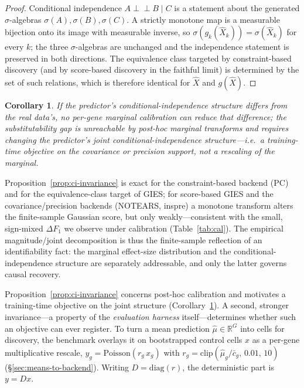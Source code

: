 \documentclass{article}
\theoremstyle{plain}
\newtheorem{corollary}[theorem]{Corollary}
\theoremstyle{definition}
\theoremstyle{remark}
\begin{document}
\begin{proof}
Conditional independence $A\perp\!\!\!\perp B\mid C$ is a statement about the generated $\sigma$-algebras $\sigma(A),\sigma(B),\sigma(C)$. A strictly monotone map is a measurable bijection onto its image with measurable inverse, so $\sigma(g_k(\hat X_k))=\sigma(\hat X_k)$ for every $k$; the three $\sigma$-algebras are unchanged and the independence statement is preserved in both directions. The equivalence class targeted by constraint-based discovery (and by score-based discovery in the faithful limit) is determined by the set of such relations, which is therefore identical for $\hat X$ and $g(\hat X)$.
\end{proof}

\begin{corollary}
\label{cor:calib-kernel}
If the predictor's conditional-independence structure differs from the real data's, no per-gene marginal calibration can reduce that difference; the substitutability gap is unreachable by post-hoc marginal transforms and requires changing the predictor's joint conditional-independence structure---i.e.\ a training-time objective on the covariance or precision support, not a rescaling of the marginal.
\end{corollary}

Proposition~\ref{prop:ci-invariance} is exact for the constraint-based backend (PC) and for the equivalence-class target of GIES; for score-based GIES and the covariance/precision backends (NOTEARS, inspre) a monotone transform alters the finite-sample Gaussian score, but only weakly---consistent with the small, sign-mixed $\Delta F_1$ we observe under calibration (Table~\ref{tab:cal}). The empirical magnitude/joint decomposition is thus the finite-sample reflection of an identifiability fact: the marginal effect-size distribution and the conditional-independence structure are separately addressable, and only the latter governs causal recovery.

Proposition~\ref{prop:ci-invariance} concerns post-hoc calibration and motivates a training-time objective on the joint structure (Corollary~\ref{cor:calib-kernel}). A second, stronger invariance---a property of the \emph{evaluation harness} itself---determines whether such an objective can ever register. To turn a mean prediction $\hat\mu\in\mathbb{R}^G$ into cells for discovery, the benchmark overlays it on bootstrapped control cells $x$ as a per-gene multiplicative rescale, $y_g = \mathrm{Poisson}(r_g\,x_g)$ with $r_g=\mathrm{clip}(\hat\mu_g/\bar c_g,\,0.01,\,10)$ (\S\ref{sec:means-to-backend}). Writing $D=\mathrm{diag}(r)$, the deterministic part is $y=Dx$.
\end{document}
